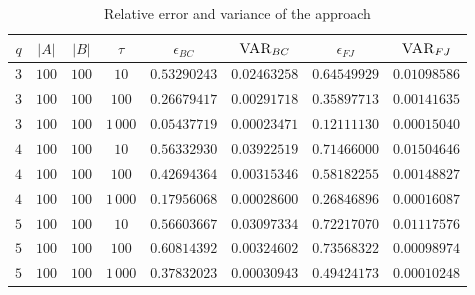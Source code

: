 \begin{table}[h]
	\centering
	\begin{tabular}{|c|c|c|c|c|c|c|c|}
		\hline
		$q$ & $|A|$ & $|B|$ & $\tau$      & $\epsilon_{BC}$ & $\textsc{VAR}_{BC}$ & $\epsilon_{FJ}$ & $\textsc{VAR}_{FJ}$ \\ \hline \hline
		$3$ & $100$ & $100$ & $10$     & $0.53290243$    & $0.02463258$        & $0.64549929$    & $0.01098586$        \\ \hline
		$3$ & $100$ & $100$ & $100$    & $0.26679417$    & $0.00291718$        & $0.35897713$    & $0.00141635$        \\ \hline
		$3$ & $100$ & $100$ & $1\,000$ & $0.05437719$    & $0.00023471$        & $0.12111130$    & $0.00015040$        \\ \hline \hline
		$4$ & $100$ & $100$ & $10$     & $0.56332930$    & $0.03922519$        & $0.71466000$    & $0.01504646$        \\ \hline
		$4$ & $100$ & $100$ & $100$    & $0.42694364$    & $0.00315346$        & $0.58182255$    & $0.00148827$        \\ \hline
		$4$ & $100$ & $100$ & $1\,000$ & $0.17956068$    & $0.00028600$        & $0.26846896$    & $0.00016087$        \\ \hline \hline
		$5$ & $100$ & $100$ & $10$     & $0.56603667$    & $0.03097334$        & $0.72217070$    & $0.01117576$        \\ \hline
		$5$ & $100$ & $100$ & $100$    & $0.60814392$    & $0.00324602$        & $0.73568322$    & $0.00098974$        \\ \hline
		$5$ & $100$ & $100$ & $1\,000$ & $0.37832023$    & $0.00030943$        & $0.49424173$    & $0.00010248$        \\ \hline
	\end{tabular}
	\caption{Relative error and variance of the \fsamp approach}	
\end{table}

